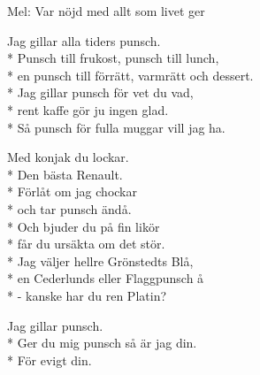 \begin{SongText}[Djungelpunsch]
    \begin{SongInfo}
        Mel: Var nöjd med allt som livet ger
    \end{SongInfo}
    \begin{SongVerse}
        Jag gillar alla tiders punsch.\\*%
        Punsch till frukost, punsch till lunch,\\*%
        en punsch till förrätt, varmrätt och dessert.\\*%
        Jag gillar punsch för vet du vad,\\*%
        rent kaffe gör ju ingen glad.\\*%
        Så punsch för fulla muggar vill jag ha.
    \end{SongVerse}
    \begin{SongVerse}
        Med konjak du lockar.\\*%
        Den bästa Renault.\\*%
        Förlåt om jag chockar\\*%
        och tar punsch ändå.\\*%
        Och bjuder du på fin likör\\*%
        får du ursäkta om det stör.\\*%
        Jag väljer hellre Grönstedts Blå,\\*%
        en Cederlunds eller Flaggpunsch å\\*%
        - kanske har du ren Platin?
    \end{SongVerse}
    \begin{SongVerse}
        Jag gillar punsch.\\*%
        Ger du mig punsch så är jag din.\\*%
        För evigt din.
    \end{SongVerse}\end{SongText}
